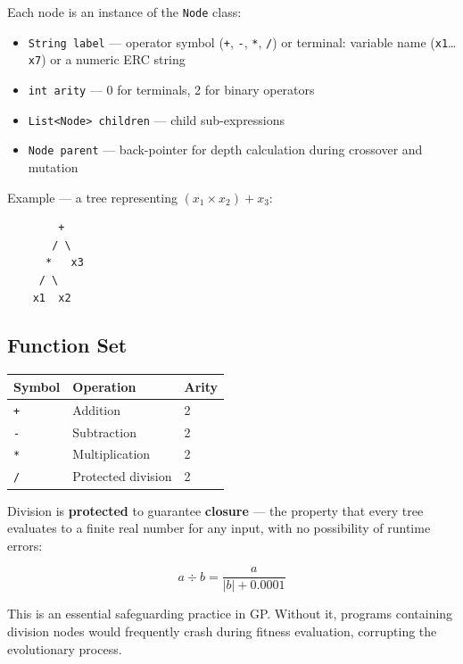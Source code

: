 \documentclass[12pt,a4paper]{article}
\begin{document}
Each node is an instance of the \texttt{Node} class:

\begin{itemize}
    \item \texttt{String label} --- operator symbol (\texttt{+}, \texttt{-}, \texttt{*}, \texttt{/}) or terminal: variable name (\texttt{x1}\ldots\texttt{x7}) or a numeric ERC string
    \item \texttt{int arity} --- 0 for terminals, 2 for binary operators
    \item \texttt{List<Node> children} --- child sub-expressions
    \item \texttt{Node parent} --- back-pointer for depth calculation during crossover and mutation
\end{itemize}

Example --- a tree representing $(x_1 \times x_2) + x_3$:

\begin{center}
\begin{lstlisting}
        +
       / \
      *   x3
     / \
    x1  x2
\end{lstlisting}
\end{center}

\subsection{Function Set}

\begin{center}
\begin{tabular}{lll}
\toprule
\textbf{Symbol} & \textbf{Operation} & \textbf{Arity} \\
\midrule
\texttt{+} & Addition & 2 \\
\texttt{-} & Subtraction & 2 \\
\texttt{*} & Multiplication & 2 \\
\texttt{/} & Protected division & 2 \\
\bottomrule
\end{tabular}
\end{center}

Division is \textbf{protected} to guarantee \textbf{closure} --- the property that every tree evaluates to a finite real number for any input, with no possibility of runtime errors:

\[
a \div b = \frac{a}{|b| + 0.0001}
\]

This is an essential safeguarding practice in GP. Without it, programs containing division nodes would frequently crash during fitness evaluation, corrupting the evolutionary process.
\end{document}
